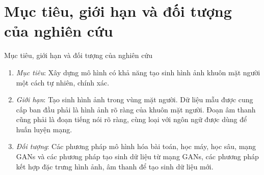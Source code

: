 \section{Mục tiêu, giới hạn và đối tượng của nghiên cứu}\label{sec:intro}
\frame{\tableofcontents[currentsection]}
\begin{frame}{Mục tiêu, giới hạn và đối tượng của nghiên cứu}
\begin{enumerate}
    \item <1-> \textit{Mục tiêu}: Xây dựng mô hình có khả năng tạo sinh hình ảnh khuôn mặt người một cách tự nhiên, chính xác.
    \item <2-> \textit{Giới hạn}: Tạo sinh hình ảnh trong vùng mặt người. Dữ liệu mẫu được cung cấp ban đầu phải là hình ảnh rõ ràng của khuôn mặt người. Đoạn âm thanh cũng phải là đoạn tiếng nói rõ ràng, cùng loại với ngôn ngữ được dùng để huấn luyện mạng.
    \item <3-> \textit{Đối tượng}: Các phương pháp mô hình hóa bài toán, học máy, học sâu, mạng GANs và các phương pháp tạo sinh dữ liệu từ mạng GANs, các phương pháp kết hợp đặc trưng hình ảnh, âm thanh để tạo sinh dữ liệu mới.
\end{enumerate}
\end{frame}
